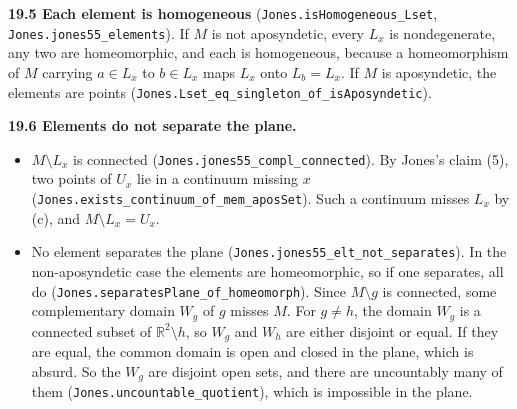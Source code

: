 \documentclass[11pt]{article}
\newcommand{\lean}[1]{\texttt{#1}}
\begin{document}
\textbf{19.5 Each element is homogeneous} (\lean{Jones.\hspace{0pt}isHomogeneous\_\hspace{0pt}Lset}, \lean{Jones.\hspace{0pt}jones55\_\hspace{0pt}elements}). If $M$ is not aposyndetic, every $L_x$ is nondegenerate, any two are homeomorphic, and each is homogeneous, because a homeomorphism of $M$ carrying $a \in L_x$ to $b \in L_x$ maps $L_x$ onto $L_b = L_x$. If $M$ is aposyndetic, the elements are points (\lean{Jones.\hspace{0pt}Lset\_\hspace{0pt}eq\_\hspace{0pt}singleton\_\hspace{0pt}of\_\hspace{0pt}isAposyndetic}).

\textbf{19.6 Elements do not separate the plane.}

\begin{itemize}
  \item $M \setminus L_x$ is connected (\lean{Jones.\hspace{0pt}jones55\_\hspace{0pt}compl\_\hspace{0pt}connected}). By Jones's claim (5), two points of $U_x$ lie in a continuum missing $x$ (\lean{Jones.\hspace{0pt}exists\_\hspace{0pt}continuum\_\hspace{0pt}of\_\hspace{0pt}mem\_\hspace{0pt}aposSet}). Such a continuum misses $L_x$ by (c), and $M \setminus L_x = U_x$.
  \item No element separates the plane (\lean{Jones.\hspace{0pt}jones55\_\hspace{0pt}elt\_\hspace{0pt}not\_\hspace{0pt}separates}). In the non-aposyndetic case the elements are homeomorphic, so if one separates, all do (\lean{Jones.\hspace{0pt}separatesPlane\_\hspace{0pt}of\_\hspace{0pt}homeomorph}). Since $M \setminus g$ is connected, some complementary domain $W_g$ of $g$ misses $M$. For $g \neq h$, the domain $W_g$ is a connected subset of $\mathbb{R}^2 \setminus h$, so $W_g$ and $W_h$ are either disjoint or equal. If they are equal, the common domain is open and closed in the plane, which is absurd. So the $W_g$ are disjoint open sets, and there are uncountably many of them (\lean{Jones.\hspace{0pt}uncountable\_\hspace{0pt}quotient}), which is impossible in the plane.
\end{itemize}
\end{document}
